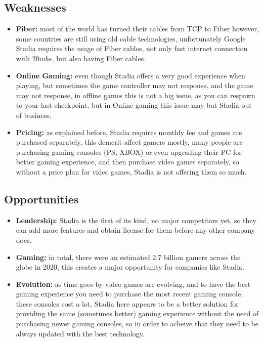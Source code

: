 \subsection{Weaknesses}
\begin{itemize}    
    \item \textbf{Fiber:} 
        most of the world has turned their cables from TCP to Fiber however, some countries are still using
        old cable technologies, unfortunately Google Stadia requires the usage of Fiber cables,
        not only fast internet connection with $20mbs$, but also having Fiber cables.
    \item \textbf{Online Gaming:}
        even though Stadia offers a very good experience when playing, but sometimes the game controller
        may not response, and the game may not response, in offline games this is not a big issue, as you
        can respawn to your last checkpoint, but in Online gaming this issue may but Stadia out of business.
    \item \textbf{Pricing:}
        as explained before, Stadia requires monthly fee and games are purchased separately, this demerit affect 
        gamers mostly, many people are purchasing gaming consoles (PS, XBOX) or even upgrading their PC for better gaming
        experience, and then purchase video games separately, so without a price plan for video games, Stadia is not
        offering them so much.
\end{itemize}

\subsection{Opportunities}
\begin{itemize}    
    \item \textbf{Leadership:}
        Stadia is the first of its kind, no major competitors yet, so they can add more features and obtain license for them
        before any other company does.
    
    \item \textbf{Gaming:}
        in total, there were an estimated 2.7 billion gamers across the globe in 2020, this creates a major opportunity
        for companies like Stadia.

    \item \textbf{Evolution:}
        as time goes by video games are evolving, and to have the best gaming experience you need to purchase the
        most recent gaming console, these consoles cost a lot, Stadia here appears to be a better solution
        for providing the same (sometimes better) gaming experience without the need of purchasing newer gaming
        consoles, so in order to acheive that they need to be always updated with the best technology.
\end{itemize}

